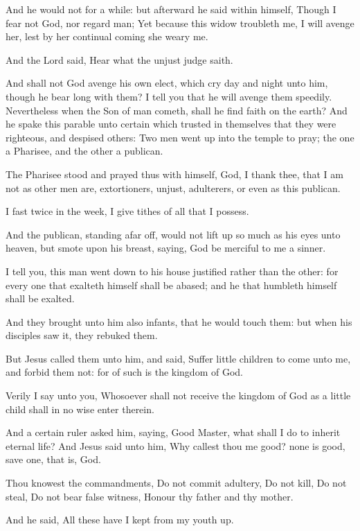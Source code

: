 \verse And he would not for a while: but afterward he said within himself, Though I fear not God, nor regard man; \verse Yet because this widow troubleth me, I will avenge her, lest by her continual coming she weary me.

\verse And the Lord said, Hear what the unjust judge saith.

\verse And shall not God avenge his own elect, which cry day and night unto him, though he bear long with them?  \verse I tell you that he will avenge them speedily. Nevertheless when the Son of man cometh, shall he find faith on the earth?  \verse And he spake this parable unto certain which trusted in themselves that they were righteous, and despised others: \verse Two men went up into the temple to pray; the one a Pharisee, and the other a publican.

\verse The Pharisee stood and prayed thus with himself, God, I thank thee, that I am not as other men are, extortioners, unjust, adulterers, or even as this publican.

\verse I fast twice in the week, I give tithes of all that I possess.

\verse And the publican, standing afar off, would not lift up so much as his eyes unto heaven, but smote upon his breast, saying, God be merciful to me a sinner.

\verse I tell you, this man went down to his house justified rather than the other: for every one that exalteth himself shall be abased; and he that humbleth himself shall be exalted.

\verse And they brought unto him also infants, that he would touch them: but when his disciples saw it, they rebuked them.

\verse But Jesus called them unto him, and said, Suffer little children to come unto me, and forbid them not: for of such is the kingdom of God.

\verse Verily I say unto you, Whosoever shall not receive the kingdom of God as a little child shall in no wise enter therein.

\verse And a certain ruler asked him, saying, Good Master, what shall I do to inherit eternal life?  \verse And Jesus said unto him, Why callest thou me good? none is good, save one, that is, God.

\verse Thou knowest the commandments, Do not commit adultery, Do not kill, Do not steal, Do not bear false witness, Honour thy father and thy mother.

\verse And he said, All these have I kept from my youth up.

